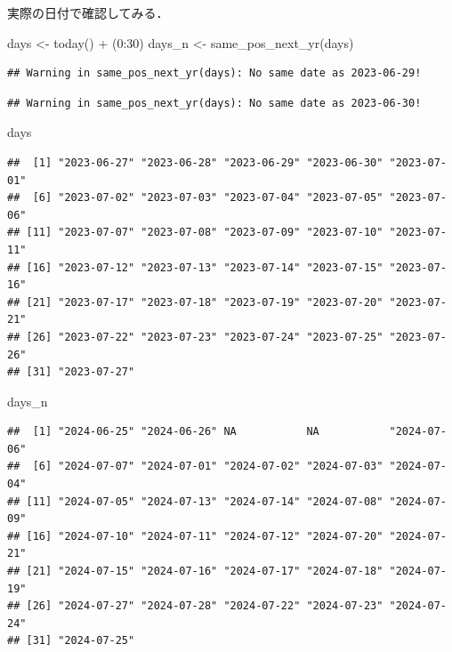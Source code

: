 \documentclass[
]{article}
\newenvironment{Shaded}{\begin{snugshade}}{\end{snugshade}}
\newcommand{\DecValTok}[1]{\textcolor[rgb]{0.00,0.00,0.81}{#1}}
\newcommand{\FunctionTok}[1]{\textcolor[rgb]{0.00,0.00,0.00}{#1}}
\newcommand{\NormalTok}[1]{#1}
\newcommand{\OtherTok}[1]{\textcolor[rgb]{0.56,0.35,0.01}{#1}}
\newcommand{\SpecialCharTok}[1]{\textcolor[rgb]{0.00,0.00,0.00}{#1}}
\begin{document}
実際の日付で確認してみる．

\begin{Shaded}
\begin{Highlighting}[]
\NormalTok{days   }\OtherTok{\textless{}{-}} \FunctionTok{today}\NormalTok{() }\SpecialCharTok{+}\NormalTok{ (}\DecValTok{0}\SpecialCharTok{:}\DecValTok{30}\NormalTok{)}
\NormalTok{days\_n }\OtherTok{\textless{}{-}} \FunctionTok{same\_pos\_next\_yr}\NormalTok{(days)}
\end{Highlighting}
\end{Shaded}

\begin{verbatim}
## Warning in same_pos_next_yr(days): No same date as 2023-06-29!
\end{verbatim}

\begin{verbatim}
## Warning in same_pos_next_yr(days): No same date as 2023-06-30!
\end{verbatim}

\begin{Shaded}
\begin{Highlighting}[]
\NormalTok{days}
\end{Highlighting}
\end{Shaded}

\begin{verbatim}
##  [1] "2023-06-27" "2023-06-28" "2023-06-29" "2023-06-30" "2023-07-01"
##  [6] "2023-07-02" "2023-07-03" "2023-07-04" "2023-07-05" "2023-07-06"
## [11] "2023-07-07" "2023-07-08" "2023-07-09" "2023-07-10" "2023-07-11"
## [16] "2023-07-12" "2023-07-13" "2023-07-14" "2023-07-15" "2023-07-16"
## [21] "2023-07-17" "2023-07-18" "2023-07-19" "2023-07-20" "2023-07-21"
## [26] "2023-07-22" "2023-07-23" "2023-07-24" "2023-07-25" "2023-07-26"
## [31] "2023-07-27"
\end{verbatim}

\begin{Shaded}
\begin{Highlighting}[]
\NormalTok{days\_n}
\end{Highlighting}
\end{Shaded}

\begin{verbatim}
##  [1] "2024-06-25" "2024-06-26" NA           NA           "2024-07-06"
##  [6] "2024-07-07" "2024-07-01" "2024-07-02" "2024-07-03" "2024-07-04"
## [11] "2024-07-05" "2024-07-13" "2024-07-14" "2024-07-08" "2024-07-09"
## [16] "2024-07-10" "2024-07-11" "2024-07-12" "2024-07-20" "2024-07-21"
## [21] "2024-07-15" "2024-07-16" "2024-07-17" "2024-07-18" "2024-07-19"
## [26] "2024-07-27" "2024-07-28" "2024-07-22" "2024-07-23" "2024-07-24"
## [31] "2024-07-25"
\end{verbatim}
\end{document}
